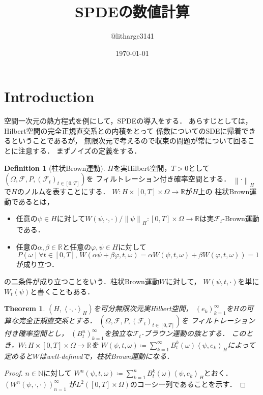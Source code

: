 \documentclass[dvipdfmx,autodetect-engine]{jsarticle}
\newtheorem{theorem}{Theorem}[section]
\theoremstyle{remark}
\theoremstyle{definition}
\newtheorem{definition}{Definition}[section]
\newcommand{\R}{\mathbb{R}}
\newcommand{\N}{\mathbb{N}}
\newcommand{\norm}[1]{\left\lVert#1\right\rVert}
\newcommand{\setmid}{\mathrel{} \middle| \mathrel{}}
\newcommand{\paren}[1]{\left( #1 \right)}
\newcommand{\iprod}[1]{\left\langle #1 \right\rangle}
\begin{document}
\title{SPDEの数値計算}
\author{@litharge3141}
\date{\today}
\maketitle

\section{Introduction}
空間一次元の熱方程式を例にして，SPDEの導入をする．
あらすじとしては，Hilbert空間の完全正規直交系との内積をとって
係数についてのSDEに帰着できるということであるが，
無限次元で考えるので収束の問題が常について回ることに注意する．
まずノイズの定義をする．


\begin{definition}[柱状Brown運動]
$H$を実Hilbert空間，$T>0$として
$(\Omega,\mathcal{F},P,(\mathcal{F}_{t})_{t\in [0,T]})$を
フィルトレーション付き確率空間とする．
$\norm{\cdot}_{H}$で$H$のノルムを表すことにする．
$W \colon H  \times [0,T] \times \Omega \to \R$が$H$上の
柱状Brown運動であるとは，
\begin{itemize}
    \item 任意の$\psi \in H$に対して$W(\psi,\cdot,\cdot) / \norm{\psi}_{H}
    \colon [0,T]\times\Omega  \to \R$は実$\mathcal{F}_{t}$-Brown運動である．
    \item 任意の$\alpha,\beta \in \R$と任意の$\varphi,\psi \in H$に対して
    \begin{equation}
        P\paren{\omega \setmid \forall t \in [0,T],\,
        W(\alpha\psi + \beta\varphi,t,\omega) = 
    \alpha W(\psi,t,\omega) + \beta W(\varphi, t, \omega)} =1
    \end{equation}
    が成り立つ．
\end{itemize}
の二条件が成り立つことをいう．柱状Brown運動$W$に対して，
$W(\psi,t,\cdot)$を単に$W_{t}(\psi)$と書くこともある．
\end{definition}


\begin{theorem}
    $(H,\iprod{\cdot,\cdot}_{H})$を可分無限次元実Hilbert空間，
    $(e_{k})_{k=1}^{\infty}$を$H$の可算な完全正規直交系とする．
    $(\Omega,\mathcal{F},P,(\mathcal{F}_{t})_{t\in [0,T]})$を
    フィルトレーション付き確率空間とし，
    $(B_{t}^{n})_{k=1}^{\infty}$を独立な$\mathcal{F}_{t}$-ブラウン運動の族とする．
    このとき，$W \colon H \times [0,T]\times \Omega  \to \R$を
    $W(\psi,t,\omega) \coloneqq \sum_{k=1}^{\infty} B_{t}^{k}(\omega) \iprod{
    \psi, e_{k}}_{H}$によって定めると$W$はwell-definedで，柱状Brown運動になる．
\end{theorem}


\begin{proof}
    $n\in\N$に対して
    $W^{n}(\psi,t,\omega) \coloneqq \sum_{k=1}^{n} B_{t}^{k}(\omega) \iprod{
    \psi, e_{k}}_{H}$とおく．$(W^{n}(\psi,\cdot,\cdot))_{n=1}^{\infty}$
    が$L^2([0,T]\times\Omega)$のコーシー列であることを示す．
\end{proof}
\end{document}
